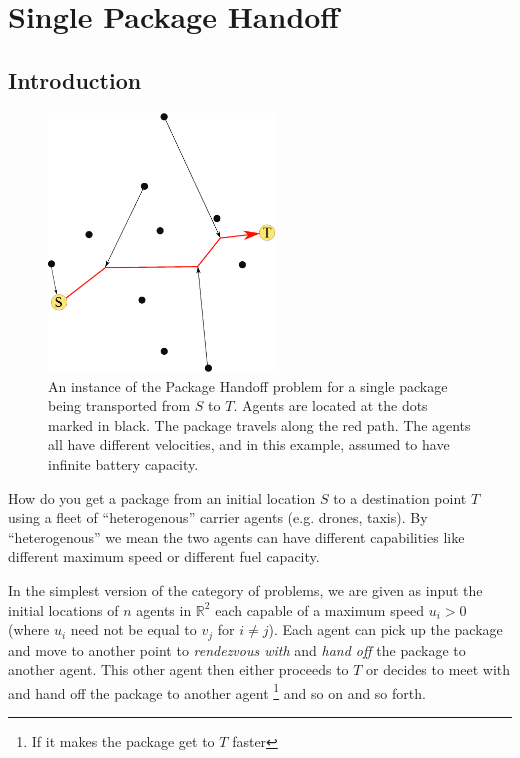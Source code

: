 \documentclass[10pt, english, oneside]{report}
\begin{document}
\newpage
\setcounter{tocdepth}{2}
\tableofcontents

\chapter{Single Package Handoff}

\section{Introduction}
\begin{figure}
  \begin{center}
    \includegraphics[width=6cm]{docs/introex.eps}
    \caption{An instance of the Package Handoff problem for a single package being transported from $S$ to $T$. 
     Agents are located at the dots marked in black. The package travels along the red path. The agents all have 
     different velocities, and in this example, assumed to have infinite battery capacity.}%
    \label{fig:introex}%
  \end{center}
\end{figure}

How do you get a package from an initial location $S$ to a destination point $T$ using a fleet of ``heterogenous'' carrier agents 
(e.g. drones, taxis). By ``heterogenous'' we mean the two agents can have different capabilities like 
different maximum speed or different fuel capacity. 


In the simplest version of the category of problems, 
we are given as input the initial locations of $n$  agents in $\mathbb{R}^2$ 
each capable of a maximum speed $u_i >0$ (where $u_i$ need not be equal to $v_j$ for $i \neq j$).
Each agent can pick up the package and move to another point to \textit{rendezvous with} and 
\textit{hand off} the 
package to another agent. This other agent then either proceeds to $T$ or decides to meet with 
and hand off the package to another agent \footnote{If it makes the package get to $T$ faster} 
and so on and so forth. 
\end{document}
